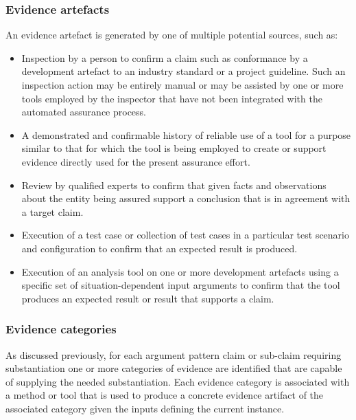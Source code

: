 \documentclass[12pt,twoside,a4paper]{article}
\begin{document}
\hypertarget{evidence-artefacts}{%
\subsubsection{Evidence artefacts}\label{evidence-artefacts}}

An evidence artefact is generated by one of multiple potential sources, such as:

\begin{itemize}
\item
  Inspection by a person to confirm a claim such as conformance by a development artefact to an industry standard or a project guideline. Such an inspection action may be entirely manual or may be assisted by one or more tools employed by the inspector that have not been integrated with the automated assurance process.
\item
  A demonstrated and confirmable history of reliable use of a tool for a purpose similar to that for which the tool is being employed to create or support evidence directly used for the present assurance effort.
\item
  Review by qualified experts to confirm that given facts and observations about the entity being assured support a conclusion that is in agreement with a target claim.
\item
  Execution of a test case or collection of test cases in a particular test scenario and configuration to confirm that an expected result is produced.
\item
  Execution of an analysis tool on one or more development artefacts using a specific set of situation-dependent input arguments to confirm that the tool produces an expected result or result that supports a claim.
\end{itemize}

\hypertarget{evidence-categories}{%
\subsubsection{Evidence categories}\label{evidence-categories}}

As discussed previously, for each argument pattern claim or sub-claim requiring substantiation one or more categories of evidence are identified that are capable of supplying the needed substantiation. Each evidence category is associated with a method or tool that is used to produce a concrete evidence artifact of the associated category given the inputs defining the current instance.
\end{document}
